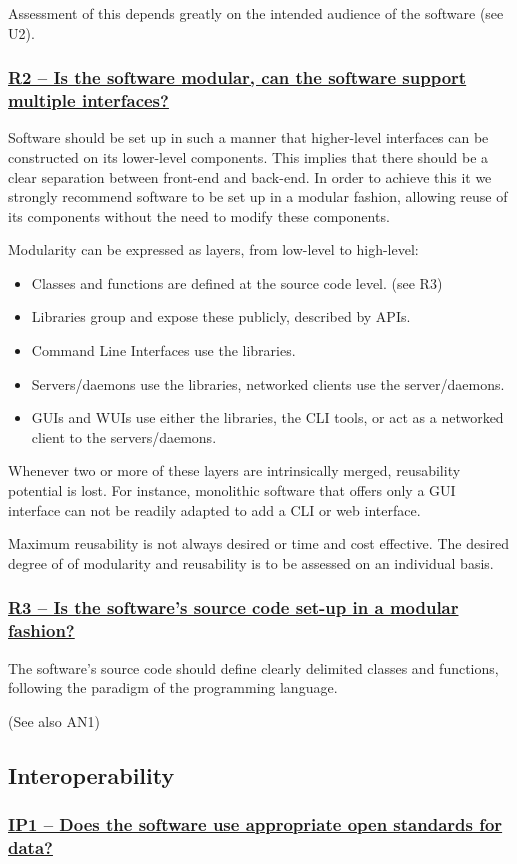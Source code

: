 \documentclass[a4paper,11pt]{article}
\newcommand{\indicator}[1]{\subsubsection*{\underline{#1}}}
\begin{document}
Assessment of this depends greatly on the intended audience of the software (see U2).

\indicator{R2 -- Is the software modular, can the software support multiple interfaces?}

Software should be set up in such a manner that higher-level interfaces can be
constructed on its lower-level components. This implies that there should be a
clear separation between front-end and back-end. In order to achieve this it we
strongly recommend software to be set up in a modular fashion, allowing reuse
of its components without the need to modify these components.

Modularity can be expressed as layers, from low-level to high-level:

\begin{itemize}
 \item Classes and functions are defined at the source code level. (see R3)
 \item Libraries group and expose these publicly, described by APIs. 
 \item Command Line Interfaces use the libraries.
 \item Servers/daemons use the libraries, networked clients use the server/daemons.
 \item GUIs and WUIs use either the libraries, the CLI tools, or act as a networked client to the servers/daemons.
\end{itemize}

Whenever two or more of these layers are intrinsically merged, reusability potential is lost.
For instance, monolithic software that offers only a GUI interface can not be
readily adapted to add a CLI or web interface.

Maximum reusability is not always desired or time and cost effective. The
desired degree of of modularity and reusability is to be assessed on an
individual basis.

\indicator{R3 -- Is the software's source code set-up in a modular fashion?}

The software's source code should define clearly delimited classes and
functions, following the paradigm of the programming language. 

(See also AN1)


\subsection{Interoperability}

\indicator{IP1 -- Does the software use appropriate open standards for data?}
\end{document}
